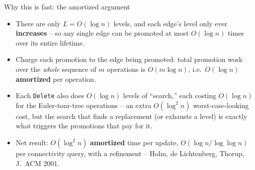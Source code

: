 \documentclass[11pt,aspectratio=169]{beamer}
\begin{document}
\begin{frame}{Why this is fast: the amortized argument}
  \begin{itemize}
    \item There are only $L = O(\log n)$ levels, and each edge's level only ever
    \textbf{increases} -- so any single edge can be promoted at most $O(\log n)$ times
    over its entire lifetime.
    \item Charge each promotion to the edge being promoted: total promotion work over
    the \emph{whole} sequence of $m$ operations is $O(m \log n)$, i.e.\ $O(\log n)$
    \textbf{amortized} per operation.
    \item Each \texttt{Delete} also does $O(\log n)$ levels of ``search,'' each costing
    $O(\log n)$ for the Euler-tour-tree operations -- an extra $O(\log^2 n)$
    worst-case-looking cost, but the search that finds a replacement (or exhausts a
    level) is exactly what triggers the promotions that pay for it.
    \item Net result: $O(\log^2 n)$ \textbf{amortized} time per update, $O(\log n /
    \log\log n)$ per connectivity query, with a refinement -- Holm, de Lichtenberg,
    Thorup, J.\ ACM 2001.
  \end{itemize}
\end{frame}
\end{document}

